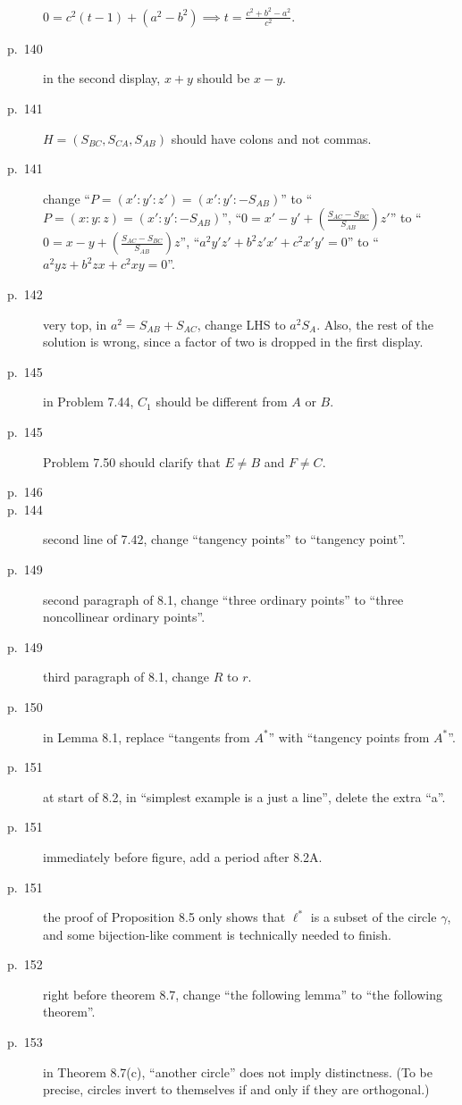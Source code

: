 \documentclass[11pt]{scrartcl}
\begin{document}
\begin{description}
  $0 = c^2(t-1) + (a^2-b^2) \implies t = \frac{c^2+b^2-a^2}{c^2}$.
\item[p.\  140] in the second display, $x+y$ should be $x-y$.
\item[p.\  141] $H = (S_{BC},S_{CA},S_{AB})$ should have
  colons and not commas.
\item[p.\  141] change ``$P = \left(x' : y' : z'\right) = \left(x' : y' : -S_{AB}\right)$''
  to ``$P = \left(x : y : z\right) = \left(x' : y' : -S_{AB}\right)$'',
  ``$0 = x' - y' + \left( \frac{S_{AC}-S_{BC}}{S_{AB}} \right) z'$''
  to ``$0 = x - y + \left( \frac{S_{AC}-S_{BC}}{S_{AB}} \right) z$'',
  ``$a^2 y'z' + b^2 z'x' + c^2 x'y' = 0$''
  to ``$a^2 yz + b^2 zx + c^2 xy = 0$''.
\item[p.\  142] very top, in $a^2=S_{AB}+S_{AC}$, change LHS to $a^2S_A$.
  Also, the rest of the solution is wrong, since a factor of two is dropped in the first display.
\item[p.\  145] in Problem 7.44, $C_1$ should be different from $A$ or $B$.
\item[p.\  145] Problem 7.50 should clarify that $E \neq B$ and $F \neq C$.
\item[p.\  146] 
\item[p.\  144] second line of 7.42, change ``tangency points'' to ``tangency point''.
\item[p.\  149] second paragraph of 8.1, change ``three ordinary points''
  to ``three noncollinear ordinary points''.
\item[p.\  149] third paragraph of 8.1, change $R$ to $r$.
\item[p.\  150] in Lemma 8.1, replace ``tangents from $A^\ast$'' with ``tangency points from $A^\ast$''.
\item[p.\  151] at start of 8.2, in ``simplest example is a just a line'', delete the extra ``a''.
\item[p.\  151] immediately before figure, add a period after 8.2A.
\item[p.\  151] the proof of Proposition 8.5 only shows that $\ell^\ast$ is a subset of the circle
  $\gamma$, and some bijection-like comment is technically needed to finish.
\item[p.\  152] right before theorem 8.7,
  change ``the following lemma'' to ``the following theorem''.
\item[p.\  153] in Theorem 8.7(c), ``another circle'' does not imply distinctness.
  (To be precise, circles invert to themselves if and only if they are orthogonal.)

\end{description}
\end{document}
